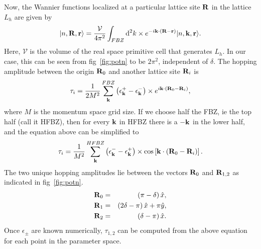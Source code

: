 \documentclass[a4paper,10pt]{article}
\begin{document}
Now, the Wannier functions localized at a particular lattice site ${\bf R}$ in the lattice $L_h$ are given by~\cite{rossler}
\begin{equation}
|n,{\bf R},{\bf r}\rangle  = \frac{\mathcal V}{4\pi^2}\int_{FBZ}{\mathrm d}^2k \times e^{-i{\bf k}\cdot\left({\bf R}-{\bf r} \right)}|n,{\bf k}, {\bf r}\rangle.
\end{equation}
Here, ${\mathcal V}$ is the volume of the real space primitive cell that generates $L_h$. In our case, this can be seen from fig~\ref{fig:potn} to be $2\pi^2$, independent of $\delta$. The hopping amplitude between the origin ${\bf R}_0$ and another lattice site ${\bf R}_i$ is~\cite{rossler}
\begin{equation}
\tau_i = \frac{1}{2M^2}\sum^{FBZ}_{\bf k}\left(\epsilon^+_{\bf k} - \epsilon^-_{\bf k} \right) \times e^{i{\bf k}\cdot\left({\bf R}_0-{\bf R}_i \right)},
\end{equation}
where $M$ is the momentum space grid size. If we choose half the FBZ, ie the top half (call it HFBZ), then for every ${\bf k}$ in HFBZ there is a $-{\bf k}$ in the lower half, and the equation above can be simplified to
\begin{equation}
 \label{eq:tau}
\tau_i = \frac{1}{M^2}\sum^{HFBZ}_{\bf k}\left(\epsilon^-_{\bf k} - \epsilon^+_{\bf k} \right) \times \cos\left[{{\bf k}\cdot\left({\bf R}_0-{\bf R}_i \right)}\right].
\end{equation}
The two unique hopping amplitudes lie between the vectors ${\bf R}_0$ and ${\bf R}_{1,2}$ as indicated in fig~\ref{fig:potn}.
\begin{eqnarray}
\label{eq:hoppingvecs}
{\bf R}_0 &=& \left(\pi-\delta\right)\hat{x}  , \nonumber \\
{\bf R}_1 &=& \left(2\delta-\pi\right)\hat{x} + \pi\hat{y} , \nonumber \\
{\bf R}_2 &=& \left(\delta-\pi\right)\hat{x} .
\end{eqnarray}
Once $\epsilon_\pm$ are known numerically, $\tau_{1,2}$ can be computed from the above equation for each point in the parameter space.
\end{document}
